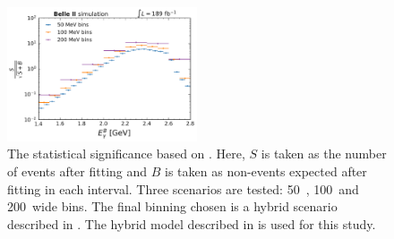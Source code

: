 \begin{figure}[hbtp!]
    \centering
    \includegraphics[width=0.5\textwidth]{figures/fitting/binning_significance.pdf}
    \caption{\label{fig:binning_significance}
    The statistical significance based on .
    Here, $S$ is taken as the number of \BtoXsgamma events after fitting and $B$ is taken as non-\BtoXsgamma events expected after fitting in each \EB interval.
    Three scenarios are tested: 50~\mev, 100~\mev and 200~\mev wide bins.
    The final binning chosen is a hybrid scenario described in .
    The hybrid model described in  is used for this study.
    }    
\end{figure}

